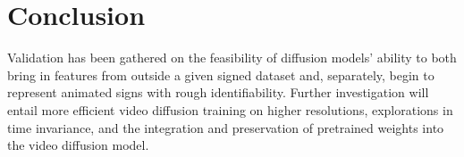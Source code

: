\documentclass{article}
\begin{document}
\section{Conclusion}
Validation has been gathered on the feasibility of diffusion models' ability to both bring in features from outside a given signed dataset and, separately, begin to represent animated signs with rough identifiability. Further investigation will entail more efficient video diffusion training on higher resolutions, explorations in time invariance, and the integration and preservation of pretrained weights into the video diffusion model. 

  
  
\end{document}
